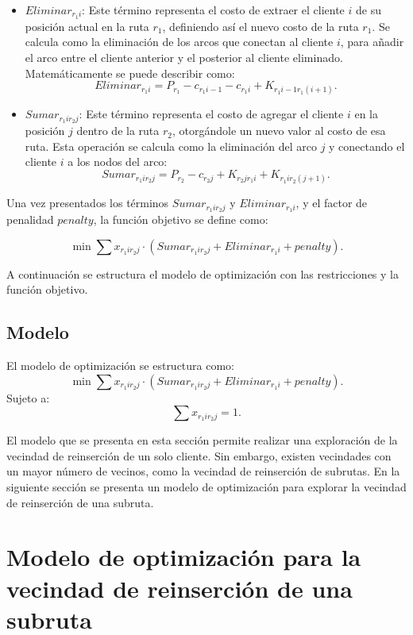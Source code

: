 \documentclass[12pt]{report}
\begin{document}
    \begin{itemize}
    	\item $Eliminar_{r_1i}$: Este término representa el costo de extraer el cliente $i$ de su posición actual en la ruta $r_1$, definiendo así el nuevo costo de la ruta $r_1$. Se calcula como la eliminación de los arcos que conectan al cliente $i$, para añadir el arco entre el cliente anterior y el posterior al cliente eliminado. Matemáticamente se puede describir como:
    	\[
    	Eliminar_{r_1i}= P_{r_1}-c_{r_1i-1}-c_{r_1i}+K_{{r_1}{i-1}{r_1}{(i+1)}}\text{.}
    	\]

    	\item $Sumar_{r_1ir_2j}$: Este término representa el costo de agregar el cliente $i$ en la posición $j$ dentro de la ruta $r_2$, otorgándole un nuevo valor al costo de esa ruta. Esta operación se calcula como la eliminación del arco $j$ y conectando el cliente $i$ a los nodos del arco:
    	\[
    	Sumar_{r_1ir_2j}= P_{r_2} - c_{{r_2}{j}} + K_{{r_2}{j}{r_1}{i}} + K_{{r_1}{i}{r_2}{(j+1)}}\text{.}
    	\]


    \end{itemize}

    Una vez presentados los términos $Sumar_{r_1ir_2j}$ y $Eliminar_{r_1i}$, y el factor de penalidad $penalty$, la función objetivo se define como:

	\[
	   	\min \sum x_{r_1ir_2j} \cdot (Sumar_{r_1ir_2j} + Eliminar_{r_1i} + penalty).
	\]

	A continuación se estructura el modelo de optimización con las restricciones y la función objetivo.

	\subsection{Modelo}

	El modelo de optimización se estructura como:
	\[
	\min \sum x_{r_1ir_2j} \cdot (Sumar_{r_1ir_2j} + Eliminar_{r_1i} + penalty).
	\]
	Sujeto a:
	\[
	\sum  x_{r_1ir_2j} = 1.
	\]



	El modelo que se presenta en esta sección permite realizar una exploración de la vecindad de reinserción de un solo cliente. Sin embargo, existen vecindades con un mayor número de vecinos, como la vecindad de reinserción de subrutas. En la siguiente sección se presenta un modelo de optimización para explorar la vecindad de reinserción de una subruta.

	\section{Modelo de optimización para la vecindad de reinserción de una subruta}
	\label{sec:Modelo de optimización para la vecindad de reinserción de una subruta}
\end{document}
